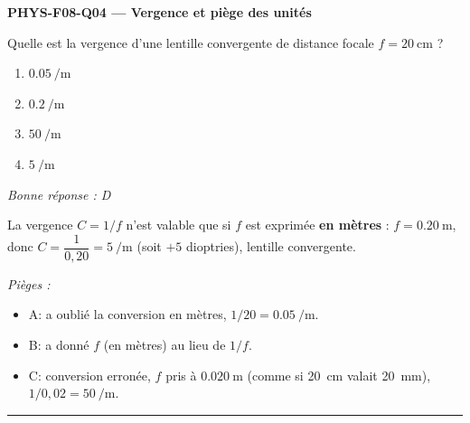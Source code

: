 \documentclass[11pt,a4paper]{article}
\begin{document}
\noindent\textbf{PHYS-F08-Q04 --- Vergence et piège des unités}\par
Quelle est la vergence d'une lentille convergente de distance focale $f=\qty{20}{\centi\metre}$ ?
\begin{enumerate}[label=\Alph*)]
\item $\qty{0.05}{\per\metre}$
\item $\qty{0.2}{\per\metre}$
\item $\qty{50}{\per\metre}$
\item $\qty{5}{\per\metre}$
\end{enumerate}
\textit{Bonne réponse : D}\par
La vergence $C=1/f$ n'est valable que si $f$ est exprimée \textbf{en mètres} : $f=\qty{0.20}{\metre}$, donc
$C=\dfrac{1}{0{,}20}=\qty{5}{\per\metre}$ (soit $+5$ dioptries), lentille convergente.\par
\textit{Pièges :}
\begin{itemize}
\item A: a oublié la conversion en mètres, $1/20=\qty{0.05}{\per\metre}$.
\item B: a donné $f$ (en mètres) au lieu de $1/f$.
\item C: conversion erronée, $f$ pris à $\qty{0.020}{\metre}$ (comme si \qty{20}{\centi\metre} valait \qty{20}{\milli\metre}), $1/0{,}02=\qty{50}{\per\metre}$.
\end{itemize}
\vspace{8pt}\hrule\vspace{8pt}
\end{document}
